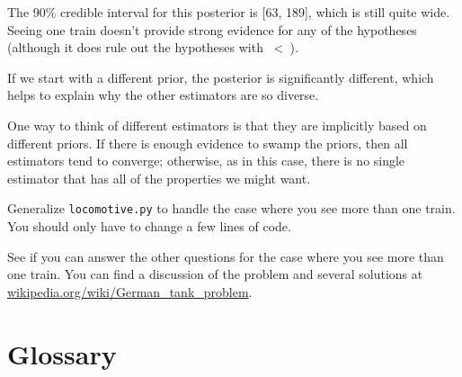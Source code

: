 \documentclass[12pt]{book}
\begin{document}
The 90\% credible interval for this posterior is [63, 189], which
is still quite wide.  Seeing one train doesn't provide strong evidence
for any of the hypotheses (although it does rule out the hypotheses
with \n~<~\ii).

If we start with a different prior, the posterior is significantly
different, which helps to explain why the other estimators are so
diverse.

One way to think of different estimators is that they are implicitly
based on different priors.  If there is enough evidence to swamp the
priors, then all estimators tend to converge; otherwise, as in this
case, there is no single estimator that has all of the properties we
might want.

\begin{exercise}
Generalize \verb"locomotive.py" to handle the case where you
see more than one train.  You should only have to
change a few lines of code.

See if you can answer the other questions for the case where you
see more than one train.  You can find a discussion of the problem
and several solutions at
\url{wikipedia.org/wiki/German_tank_problem}.

\end{exercise}

\section{Glossary}
\end{document}
